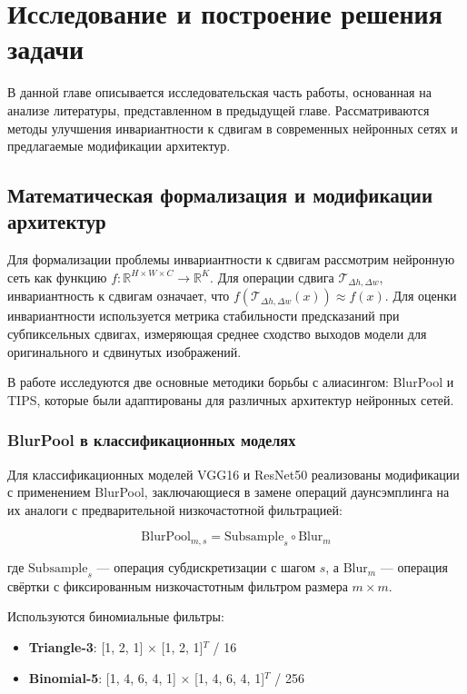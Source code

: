 \section{Исследование и построение решения задачи}
\label{sec:Chapter3} 

В данной главе описывается исследовательская часть работы, основанная на анализе литературы, представленном в предыдущей главе. Рассматриваются методы улучшения инвариантности к сдвигам в современных нейронных сетях и предлагаемые модификации архитектур.

\subsection{Математическая формализация и модификации архитектур}
\label{sec:math}

Для формализации проблемы инвариантности к сдвигам рассмотрим нейронную сеть как функцию $f: \mathbb{R}^{H \times W \times C} \rightarrow \mathbb{R}^K$. Для операции сдвига $\mathcal{T}_{\Delta h, \Delta w}$, инвариантность к сдвигам означает, что $f(\mathcal{T}_{\Delta h, \Delta w}(x)) \approx f(x)$. Для оценки инвариантности используется метрика стабильности предсказаний при субпиксельных сдвигах, измеряющая среднее сходство выходов модели для оригинального и сдвинутых изображений.

В работе исследуются две основные методики борьбы с алиасингом: BlurPool и TIPS, которые были адаптированы для различных архитектур нейронных сетей.

\subsubsection{BlurPool в классификационных моделях}
\label{sec:architectures:blurpool_classification}

Для классификационных моделей VGG16 и ResNet50 реализованы модификации с применением BlurPool, заключающиеся в замене операций даунсэмплинга на их аналоги с предварительной низкочастотной фильтрацией:

$$\text{BlurPool}_{m,s} = \text{Subsample}_{s} \circ \text{Blur}_{m}$$

где $\text{Subsample}_{s}$ — операция субдискретизации с шагом $s$, а $\text{Blur}_{m}$ — операция свёртки с фиксированным низкочастотным фильтром размера $m \times m$.

Используются биномиальные фильтры:
\begin{itemize}
    \item \textbf{Triangle-3}: [1, 2, 1] × [1, 2, 1]$^{T}$ / 16
    \item \textbf{Binomial-5}: [1, 4, 6, 4, 1] × [1, 4, 6, 4, 1]$^{T}$ / 256
\end{itemize}

